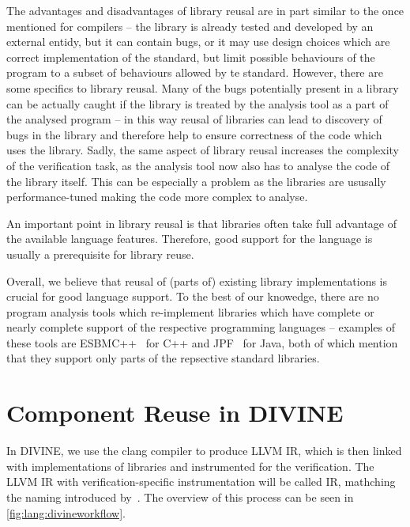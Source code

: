 The advantages and disadvantages of library reusal are in part similar to the
once mentioned for compilers -- the library is already tested and developed by
an external entidy, but it can contain bugs, or it may use design choices which
are correct implementation of the standard, but limit possible behaviours of
the program to a subset of behaviours allowed by te standard.
However, there are some specifics to library reusal.
Many of the bugs potentially present in a library can be actually caught if the
library is treated by the analysis tool as a part of the analysed program -- in
this way reusal of libraries can lead to discovery of bugs in the library and
therefore help to ensure correctness of the code which uses the
library.
Sadly, the same aspect of library reusal increases the complexity of the
verification task, as the analysis tool now also has to analyse the code of the
library itself.
This can be especially a problem as the libraries are ususally performance-tuned making the code more complex to analyse.

An important point in library reusal is that libraries often take full advantage of the available language features.
Therefore, good support for the language is usually a prerequisite for library reuse.

Overall, we believe that reusal of (parts of) existing library implementations is crucial for good language support.
To the best of our knowedge, there are no program analysis tools which
re-implement libraries which have complete or nearly complete support of the
respective programming languages -- examples of these tools are
ESBMC++~\cite{Ramalho2013} for C++ and JPF~\cite{Artho2019} for Java, both of
which mention that they support only parts of the repsective standard
libraries.

\section{Component Reuse in DIVINE}\label{sec:lang:divine}

In DIVINE, we use the clang compiler to produce LLVM IR, which is then linked
with implementations of libraries and instrumented for the verification.
The LLVM IR with verification-specific instrumentation will be called \divm IR,
mathching the naming introduced by~\cite{DIVINEToolPaper2017}.
The overview of this process can be seen in \autoref{fig:lang:divineworkflow}.


